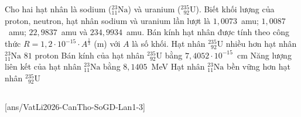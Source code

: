 	\begin{ex}%
		Cho hai hạt nhân là sodium (${}^{23}_{11}\text{Na}$) và uranium ($^{235}_{\phantom{2}92}\text{U}$). Biết khối lượng của proton, neutron, hạt nhân sodium và uranium lần lượt là $1{,}0073$~amu; $1{,}0087$~amu; $22{,}9837$~amu và $234{,}9934$~amu. Bán kính hạt nhân được tính theo công thức $R=1{,}2\cdot 10^{-15}\cdot A^{\frac{1}{3}}$ (m) với $A$ là số khối.
		\choiceTFt
		{\True Hạt nhân $^{235}_{\phantom{2}92}\text{U}$ nhiều hơn hạt nhân ${}^{23}_{11}\text{Na}$ $81$ proton}
		{Bán kính của hạt nhân $^{235}_{\phantom{2}92}\text{U}$ bằng $7{,}4052\cdot 10^{-15}$~cm}
		{Năng lượng liên kết của hạt nhân ${}^{23}_{11}\text{Na}$ bằng $8{,}1405$~MeV}
		{\True Hạt nhân ${}^{23}_{11}\text{Na}$ bền vững hơn hạt nhân $^{235}_{\phantom{2}92}\text{U}$}
	\end{ex}

	\subsection*{}
	\setcounter{ex}{0}
	[ans/VatLi2026-CanTho-SoGD-Lan1-3]

